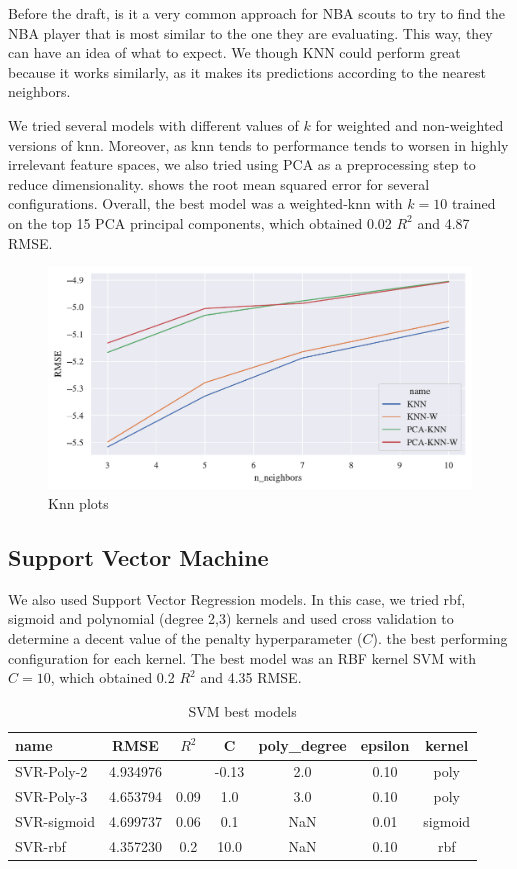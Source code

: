 Before the draft, is it a very common approach for NBA scouts to try to find the NBA player that is most similar to the one they are evaluating. This way, they can have an idea of what to expect. We though KNN could perform great because it works similarly, as it makes its predictions according to the nearest neighbors.

We tried several models with different values of $k$ for weighted and non-weighted versions of knn. Moreover, as knn tends to performance tends to worsen in highly irrelevant feature spaces, we also tried using PCA as a preprocessing step to reduce dimensionality.  shows the root mean squared error for several configurations. Overall, the best model was a weighted-knn with $k=10$ trained on the top 15 PCA principal components, which obtained 0.02 $R^2$ and 4.87 RMSE.

\begin{figure}[H]
    \centering
    \includegraphics[width=0.7\linewidth]{figures/knn.pdf}
    \caption{Knn plots}
    \label{fig:knn}
\end{figure}

\subsection{Support Vector Machine}%
\label{ssub:support-vector-machine}

We also used Support Vector Regression models. In this case, we tried rbf, sigmoid and polynomial (degree 2,3) kernels and used cross validation to determine a decent value of the penalty hyperparameter ($C$).  the best performing configuration for each kernel. The best model was an RBF kernel SVM with $C=10$, which obtained 0.2 $R^2$ and 4.35 RMSE.

\begin{table}[H]
    \centering
    \begin{tabular}{lcccccc}
    \toprule
    name & RMSE & $R^2$ & C &  poly\_degree &  epsilon & kernel \\
    \midrule
    SVR-Poly-2 & 4.934976 & & -0.13 & 2.0 &  0.10 & poly \\
    SVR-Poly-3 & 4.653794 & 0.09 & 1.0 & 3.0 & 0.10 & poly \\
    SVR-sigmoid & 4.699737 & 0.06 & 0.1 & NaN & 0.01 & sigmoid \\
    SVR-rbf & 4.357230 & 0.2 & 10.0 & NaN & 0.10 &  rbf \\
    \bottomrule
    \end{tabular}
    \caption{SVM best models}
    \label{ml:svm}
\end{table}

